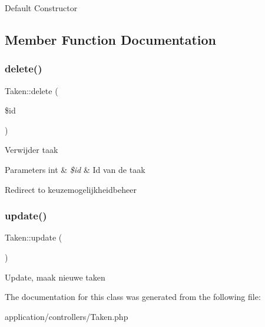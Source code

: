 Default Constructor

\subsection{Member Function Documentation}
\mbox{\label{class_taken_a696d6a2a1c533a261e2f0e29a4537662}} 
\subsubsection{\texorpdfstring{delete()}{delete()}}
{\footnotesize\ttfamily Taken\+::delete (\begin{DoxyParamCaption}\item[{}]{\$id }\end{DoxyParamCaption})}

Verwijder taak 
\begin{DoxyParams}[1]{Parameters}
int & {\em \$id} & Id van de taak \\
\hline
\end{DoxyParams}
Redirect to keuzemogelijkheidbeheer \mbox{\label{class_taken_a2c370b12ed83ff4617224675576b47a1}} 
\subsubsection{\texorpdfstring{update()}{update()}}
{\footnotesize\ttfamily Taken\+::update (\begin{DoxyParamCaption}{ }\end{DoxyParamCaption})}

Update, maak nieuwe taken 

The documentation for this class was generated from the following file\+:\begin{DoxyCompactItemize}
\item 
application/controllers/Taken.\+php\end{DoxyCompactItemize}
